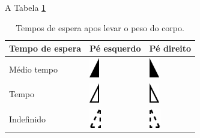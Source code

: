 A Tabela \ref{tab:simbolospe}
\begin{table}[!hbt]
\caption{Tempos de espera apos levar o peso do corpo.}
\begin{center}
\begin{tabular}{|l |l | l |}
\hline
Tempo de espera  & Pé esquerdo & Pé direito \\
\hline
\hline
Médio tempo  & 
\includegraphics[height=24pt]{chapters/cap-partituramov/torso-pe-esquerdo-contratempo.eps}   & 
\includegraphics[height=24pt]{chapters/cap-partituramov/torso-pe-direito-contratempo.eps}   \\
\hline
Tempo  & 
\includegraphics[height=24pt]{chapters/cap-partituramov/torso-pe-esquerdo-tempo.eps}   & 
\includegraphics[height=24pt]{chapters/cap-partituramov/torso-pe-direito-tempo.eps}   \\
\hline
Indefinido & 
\includegraphics[height=24pt]{chapters/cap-partituramov/torso-pe-esquerdo-indef.eps}   & 
\includegraphics[height=24pt]{chapters/cap-partituramov/torso-pe-direito-indef.eps}   \\
\hline
\hline
\end{tabular}
\end{center}
\label{tab:simbolospe}
\end{table}
